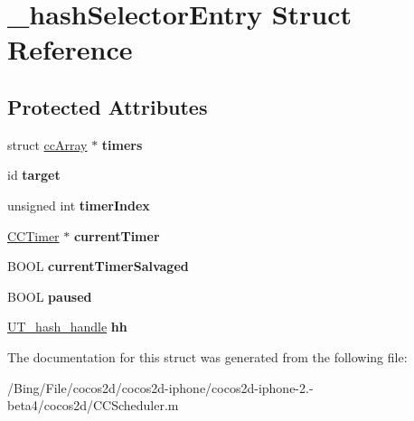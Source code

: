 \hypertarget{struct__hash_selector_entry}{\section{\-\_\-hash\-Selector\-Entry Struct Reference}
\label{struct__hash_selector_entry}
}
\subsection*{Protected Attributes}
\begin{DoxyCompactItemize}
\item 
\hypertarget{struct__hash_selector_entry_a7cad3c011280d8c3a395f194e36fefb4}{struct \hyperlink{structcc_array}{cc\-Array} $\ast$ {\bfseries timers}}\label{struct__hash_selector_entry_a7cad3c011280d8c3a395f194e36fefb4}

\item 
\hypertarget{struct__hash_selector_entry_a46cc9aaa4ae05b65224a2bd8b15cdbf0}{id {\bfseries target}}\label{struct__hash_selector_entry_a46cc9aaa4ae05b65224a2bd8b15cdbf0}

\item 
\hypertarget{struct__hash_selector_entry_a59097dfb75a2371b892cf2a25e041bd1}{unsigned int {\bfseries timer\-Index}}\label{struct__hash_selector_entry_a59097dfb75a2371b892cf2a25e041bd1}

\item 
\hypertarget{struct__hash_selector_entry_a64fd6872d164829d7d469226847ffcd3}{\hyperlink{interface_c_c_timer}{C\-C\-Timer} $\ast$ {\bfseries current\-Timer}}\label{struct__hash_selector_entry_a64fd6872d164829d7d469226847ffcd3}

\item 
\hypertarget{struct__hash_selector_entry_a5f3cb2fe87f25e7e2cc457cd2d265044}{B\-O\-O\-L {\bfseries current\-Timer\-Salvaged}}\label{struct__hash_selector_entry_a5f3cb2fe87f25e7e2cc457cd2d265044}

\item 
\hypertarget{struct__hash_selector_entry_a9058fa6e516eaf9df642e482c5a88dcf}{B\-O\-O\-L {\bfseries paused}}\label{struct__hash_selector_entry_a9058fa6e516eaf9df642e482c5a88dcf}

\item 
\hypertarget{struct__hash_selector_entry_ad007cfdf3a7df8672a9c6901e70c97ea}{\hyperlink{struct_u_t__hash__handle}{U\-T\-\_\-hash\-\_\-handle} {\bfseries hh}}\label{struct__hash_selector_entry_ad007cfdf3a7df8672a9c6901e70c97ea}

\end{DoxyCompactItemize}


The documentation for this struct was generated from the following file\-:\begin{DoxyCompactItemize}
\item 
/\-Bing/\-File/cocos2d/cocos2d-\/iphone/cocos2d-\/iphone-\/2.-\/beta4/cocos2d/C\-C\-Scheduler.\-m\end{DoxyCompactItemize}
